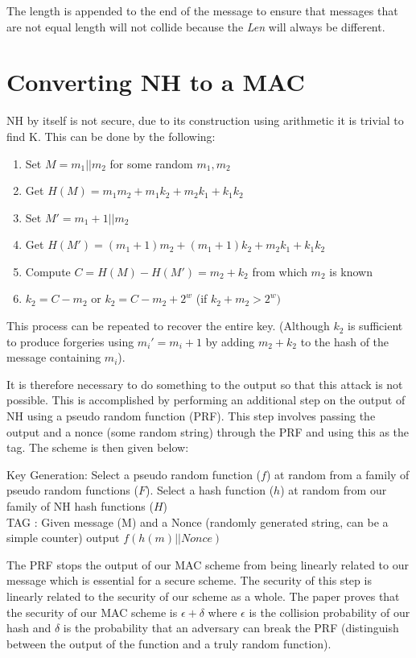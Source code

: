 \documentclass[10pt]{article} %
\begin{document}
The length is appended to the end of the message to ensure that messages that
are not equal length will not collide because the \emph{Len} will always be different.

\section{Converting NH to a MAC}

NH by itself is not secure, due to its construction using arithmetic it is
trivial to find K. This can be done by the following:
\begin{enumerate}
\item Set $M = m_1||m_2$ for some random $m_1,m_2$
\item Get $H(M) = m_1m_2 + m_1k_2 + m_2k_1 + k_1k_2$
\item Set $M' = m_1+1||m_2$
\item Get $H(M') = (m_1+1)m_2 + (m_1+1)k_2 + m_2k_1 + k_1k_2$
\item Compute $C = H(M) - H(M') = m_2 + k_2$ from which $m_2$ is known
\item $k_2 = C - m_2$ or $k_2 = C - m_2 + 2^w$ (if $k_2 + m_2 > 2^w)$
\end{enumerate}

This process can be repeated to recover the entire key. (Although $k_2$ is
sufficient to produce forgeries using $m_i' = m_i+1$ by adding $m_2+k_2$ to the
hash of the message containing $m_i$).

It is therefore necessary to do something to the output so that this attack is
not possible. This is accomplished by performing an additional step on the
output of NH using a pseudo random function (PRF). This step involves passing
the output and a nonce (some random string) through the PRF and using this as
the tag. The scheme is then given below:

Key Generation: Select a pseudo random function ($f$) at random from a family of
pseudo random functions ($F$). Select a hash function ($h$) at random from our family
of NH hash functions ($H$)\\
TAG : Given message (M) and a Nonce (randomly generated string, can be a simple
counter) output $f(h(m)||Nonce)$

The PRF stops the output of our MAC scheme from being linearly related to our
message which is essential for a secure scheme. The security of this step is
linearly related to the security of our scheme as a whole. The paper proves
that the security of our MAC scheme is $\epsilon + \delta$ where $\epsilon$ is
the collision probability of our hash and $\delta$ is the probability that an
adversary can break the PRF (distinguish between the output of the function and
a truly random function).
\end{document}
